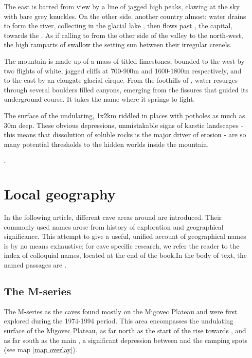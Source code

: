 The east is barred from view by a line of jagged high peaks, clawing at the sky with bare grey knuckles. On the other side, another country almost: water drains to form the \passage{} river, collecting in the glacial lake , then flows past , the capital, towards the . As if calling to  from the other side of the  valley to the north-west, the high ramparts of  swallow the setting sun between their irregular crenels.

The mountain is made up of a mass of titled limestones, bounded to the west by two flights of white, jagged cliffs at 700-900m and 1600-1800m respectively, and to the east by an elongate glacial cirque. From the foothills of , water resurges through several boulders filled canyons, emerging from the fissures that guided its underground course. It takes the name  where it springs to light.  

The surface of the undulating, 1x2km  riddled in places with potholes as much as 30m deep. These obvious depressions, unmistakable signs of karstic landscapes - this means that dissolution of soluble rocks is the major driver of erosion  - are so many potential thresholds to the hidden worlds inside the mountain.

. 

\section{Local geography}
In the following article, different cave areas around  are introduced. Their commonly used names arose from history of exploration and geographical significance. This attempt to give a useful, unified account of geographical names is by no means exhaustive; for cave specific research, we refer the reader to the index of colloquial names, located at the end of the book.In the body of text, the named passages are .

\subsection{The M-series} 
The M-series as the caves found mostly on the Migovec Plateau and were first explored during the 1974-1994 period. This area encompasses the undulating surface of the Migovec Plateau, as far north as the start of the rise towards \protect{}, and as far south as the main \protect{}, a significant depression between \protect{} and the camping spots (see map \ref{map overlay}).


